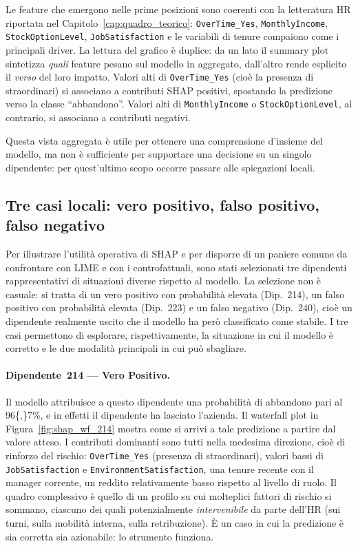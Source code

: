 Le feature che emergono nelle prime posizioni sono coerenti con la letteratura HR riportata nel Capitolo~\ref{cap:quadro_teorico}: \texttt{OverTime\_Yes}, \texttt{MonthlyIncome}, \texttt{StockOptionLevel}, \texttt{JobSatisfaction} e le variabili di tenure compaiono come i principali driver. La lettura del grafico è duplice: da un lato il summary plot sintetizza \emph{quali} feature pesano sul modello in aggregato, dall'altro rende esplicito il \emph{verso} del loro impatto. Valori alti di \texttt{OverTime\_Yes} (cioè la presenza di straordinari) si associano a contributi SHAP positivi, spostando la predizione verso la classe ``abbandono''. Valori alti di \texttt{MonthlyIncome} o \texttt{StockOptionLevel}, al contrario, si associano a contributi negativi.

Questa vista aggregata è utile per ottenere una comprensione d'insieme del modello, ma non è sufficiente per supportare una decisione su un singolo dipendente: per quest'ultimo scopo occorre passare alle spiegazioni locali.

\subsection{Tre casi locali: vero positivo, falso positivo, falso negativo}

Per illustrare l'utilità operativa di SHAP e per disporre di un paniere comune da confrontare con LIME e con i controfattuali, sono stati selezionati tre dipendenti rappresentativi di situazioni diverse rispetto al modello. La selezione non è casuale: si tratta di un vero positivo con probabilità elevata (Dip.~214), un falso positivo con probabilità elevata (Dip.~223) e un falso negativo (Dip.~240), cioè un dipendente realmente uscito che il modello ha però classificato come stabile. I tre casi permettono di esplorare, rispettivamente, la situazione in cui il modello è corretto e le due modalità principali in cui può sbagliare.

\paragraph{Dipendente~214 --- Vero Positivo.} Il modello attribuisce a questo dipendente una probabilità di abbandono pari al \num{96{,}7}\%, e in effetti il dipendente ha lasciato l'azienda. Il waterfall plot in Figura~\ref{fig:shap_wf_214} mostra come si arrivi a tale predizione a partire dal valore atteso. I contributi dominanti sono tutti nella medesima direzione, cioè di rinforzo del rischio: \texttt{OverTime\_Yes} (presenza di straordinari), valori bassi di \texttt{JobSatisfaction} e \texttt{EnvironmentSatisfaction}, una tenure recente con il manager corrente, un reddito relativamente basso rispetto al livello di ruolo. Il quadro complessivo è quello di un profilo su cui molteplici fattori di rischio si sommano, ciascuno dei quali potenzialmente \emph{intervenibile} da parte dell'HR (sui turni, sulla mobilità interna, sulla retribuzione). È un caso in cui la predizione è sia corretta sia azionabile: lo strumento funziona.

